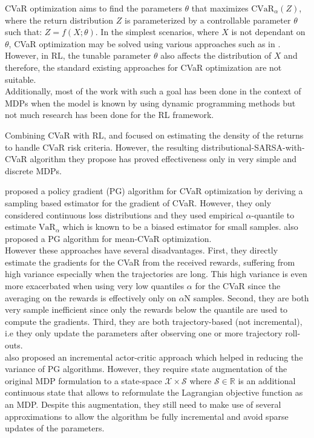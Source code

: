 CVaR optimization aims to find the parameters $\theta$ that maximizes 
$\text{CVaR}_\alpha (Z)$, where the return distribution $Z$ is parameterized by a 
controllable parameter $\theta$ such that: $Z = f(X; \theta)$. In the simplest scenarios, 
where $X$ is not dependant on $\theta$, CVaR optimization may 
be solved using various approaches such as in \citet{Rockafellar2000}.\\
However, in RL, the tunable parameter $\theta$ also affects the 
distribution of $X$ and therefore, the standard existing approaches for CVaR optimization 
are not suitable.\\
Additionally, most of the work with such a goal has been done in the context of MDPs when
the model is known  by using dynamic programming methods \citep{Chow2015, Petrik2012}
but not much research has been done for the RL framework.

Combining CVaR with RL, \citet{Morimura2010a} and \citet{Morimura2010b}
focused on estimating the density of the returns
to handle CVaR risk criteria. However, the resulting distributional-SARSA-with-CVaR algorithm
they propose has  proved  effectiveness  only  in  very simple  and discrete MDPs.

\citet{Tamar2015a} proposed a policy gradient (PG) algorithm for CVaR optimization by
deriving a sampling based estimator for the gradient of CVaR. However, they only considered continuous loss distributions
and they used empirical $\alpha$-quantile to estimate 
$\text{VaR}_\alpha$ which is known to be a biased estimator for small samples.
\citet{Chow2014} also proposed a PG algorithm for mean-CVaR optimization.\\
However these approaches
have several disadvantages.
First, they directly estimate the gradients for the CVaR from the received rewards,
suffering from high variance especially when the trajectories
are long. This high variance is even more exacerbated when using very low quantiles $\alpha$ for the CVaR 
since the averaging on the rewards is effectively only on $\alpha$N samples.
Second, they are both very sample inefficient since only the rewards below the quantile
are used to compute the gradients. Third, they are both trajectory-based (not incremental), 
i.e they only update the parameters after observing one or more trajectory roll-outs.\\
\citet{Chow2014} also proposed an incremental actor-critic
approach which helped in reducing the variance of PG algorithms. However, they require
state augmentation of the original MDP formulation to a state-space
$\mathcal{X} \times \mathcal{S}$ where $\mathcal{S} \in \mathbb R$ is an additional continuous
state that allows to reformulate the Lagrangian objective function as an MDP. Despite this augmentation,
they still need to make use of several approximations to allow the algorithm be fully incremental and 
avoid sparse updates of the parameters. 

